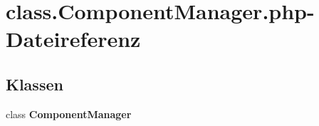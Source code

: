 \section{class.ComponentManager.php-Dateireferenz}
\label{class_8ComponentManager_8php}
\subsection*{Klassen}
\begin{CompactItemize}
\item 
class {\bf ComponentManager}
\end{CompactItemize}
